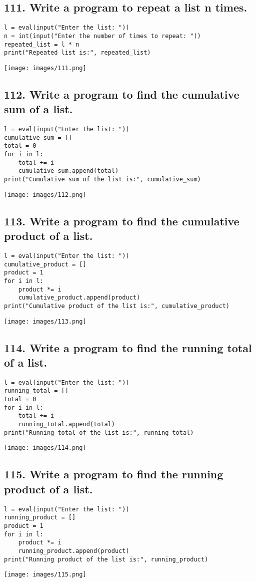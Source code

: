 \documentclass[12pt]{article}
\begin{document}
\subsection*{111. Write a program to repeat a list n times.}
\begin{verbatim}
l = eval(input("Enter the list: "))
n = int(input("Enter the number of times to repeat: "))
repeated_list = l * n
print("Repeated list is:", repeated_list)
\end{verbatim}
\texttt{[image: images/111.png]}

\subsection*{112. Write a program to find the cumulative sum of a list.}
\begin{verbatim}
l = eval(input("Enter the list: "))
cumulative_sum = []
total = 0
for i in l:
    total += i
    cumulative_sum.append(total)
print("Cumulative sum of the list is:", cumulative_sum)
\end{verbatim}
\texttt{[image: images/112.png]}

\subsection*{113. Write a program to find the cumulative product of a list.}
\begin{verbatim}
l = eval(input("Enter the list: "))
cumulative_product = []
product = 1
for i in l:
    product *= i
    cumulative_product.append(product)
print("Cumulative product of the list is:", cumulative_product)
\end{verbatim}
\texttt{[image: images/113.png]}

\subsection*{114. Write a program to find the running total of a list.}
\begin{verbatim}
l = eval(input("Enter the list: "))
running_total = []
total = 0
for i in l:
    total += i
    running_total.append(total)
print("Running total of the list is:", running_total)
\end{verbatim}
\texttt{[image: images/114.png]}

\subsection*{115. Write a program to find the running product of a list.}
\begin{verbatim}
l = eval(input("Enter the list: "))
running_product = []
product = 1
for i in l:
    product *= i
    running_product.append(product)
print("Running product of the list is:", running_product)
\end{verbatim}
\texttt{[image: images/115.png]}
\end{document}
